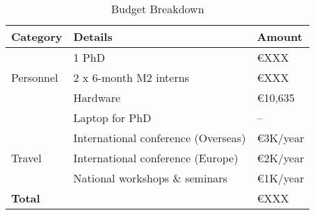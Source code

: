 \documentclass[11pt, a4paper]{article}
\begin{document}
\begin{table}[H]
    \centering
   \caption{Budget Breakdown}
    \begin{tabular}{|ll|l|}
        \toprule
        \textbf{Category} & \textbf{Details} & \textbf{Amount} \\
        \midrule
        \multirow{3}{*}{Personnel} 
            & 1 PhD & €XXX \\
            & 2 x 6-month M2 interns & €XXX \\
        \midrule
        \multirow{2}{*}{Equipment} 
            & Hardware & €10,635 \\
            & Laptop for PhD & -- \\
        \midrule
        \multirow{3}{*}{Travel} 
            & International conference (Overseas) & €3K/year \\
            & International conference (Europe) & €2K/year \\
            & National workshops \& seminars & €1K/year \\
        \midrule
        \textbf{Total} &  & €XXX \\
        \bottomrule
    \end{tabular}
    \label{tab:budget}
\end{table}
\newpage
\end{document}
